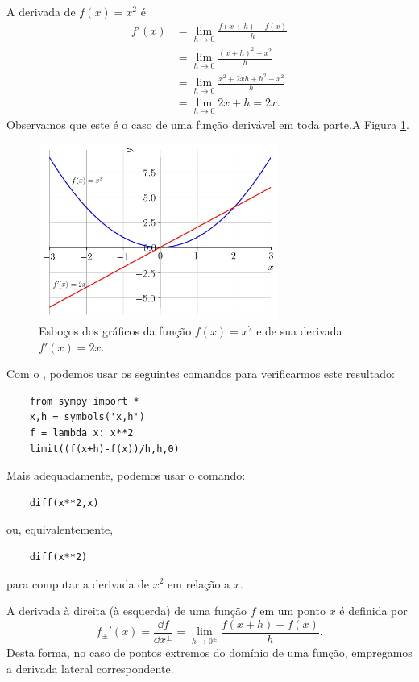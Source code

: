 \begin{ex}
  A derivada de $f(x) = x^2$ é
  \begin{align}
    f'(x) &= \lim_{h\to 0} \frac{f(x+h)-f(x)}{h}\\
          &= \lim_{h\to 0} \frac{(x+h)^2 - x^2}{h}\\
          &= \lim_{h\to 0} \frac{x^2+2xh+h^2-x^2}{h}\\
          &= \lim_{h\to 0} 2x+h = 2x.
  \end{align}
  Observamos que este é o caso de uma função derivável em toda parte.A Figura \ref{fig:deriv_ex_ffl_x2}.

  \begin{figure}[H]
    \centering
    \includegraphics[width=0.7\textwidth]{./cap_deriv/dados/fig_deriv_ex_ffl_x2/fig}
    \caption{Esboços dos gráficos da função $f(x)=x^2$ e de sua derivada $f'(x) = 2x$.}
    \label{fig:deriv_ex_ffl_x2}
  \end{figure}  
  
  \ifispython
  Com o \sympy, podemos usar os seguintes comandos para verificarmos este resultado:
  \begin{lstlisting}
    from sympy import *
    x,h = symbols('x,h')
    f = lambda x: x**2
    limit((f(x+h)-f(x))/h,h,0)
  \end{lstlisting}

  Mais adequadamente, podemos usar o comando:
  \begin{lstlisting}
    diff(x**2,x)
  \end{lstlisting}
  ou, equivalentemente,
  \begin{lstlisting}
    diff(x**2)
  \end{lstlisting}
  para computar a derivada de $x^2$ em relação a $x$.
  \fi
\end{ex}

\begin{obs}
  A derivada à direita (à esquerda) de uma função $f$ em um ponto $x$ é definida por
  \begin{equation}
    f_{\pm}'(x) = \frac{\dd f}{\dd x^{\pm}} = \lim_{h\to 0^\pm} \frac{f(x+h)-f(x)}{h}.
  \end{equation}
  Desta forma, no caso de pontos extremos do domínio de uma função, empregamos a derivada lateral correspondente.
\end{obs}

